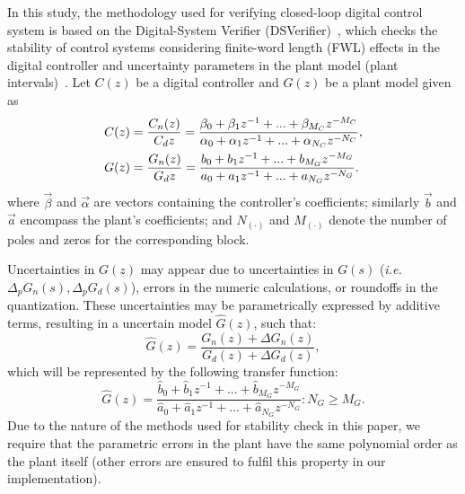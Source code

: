 \documentclass{sig-alternate-05-2015}
\begin{document}
In this study, the methodology used for verifying closed-loop digital
control system is based on the Digital-System Verifier
(DSVerifier)~\cite{IsmailBCFF15}, which checks the stability of control
systems considering finite-word length (FWL) effects in the digital
controller and uncertainty parameters in the plant model (plant
intervals)~\cite{Bessa16}.  Let $C(z)$ be a digital controller and $G(z)$ be
a plant model given as
%
\begin{align}
\small
\label{controller_plant_tf}
C(z)&=\frac{C_n(z)}{C_d{z}}=\frac{\beta_{0}+\beta_{1}z^{-1}+...+\beta_{M_C}z^{-M_C}}{\alpha_{0}+\alpha_{1}z^{-1}+...+\alpha_{N_C}z^{-N_C}}, \\
G(z)&=\frac{G_n(z)}{G_d{z}}=\frac{b_{0}+b_{1}z^{-1}+...+b_{M_G}z^{-M_G}}{a_{0}+a_{1}z^{-1}+...+a_{N_G}z^{-N_G}}.
\end{align}
%
\noindent where $\vec{\beta}$ and $\vec{\alpha}$ are vectors containing the
controller's coefficients; similarly $\vec{b}$ and $\vec{a}$ encompass the
plant's coefficients; and $N_{(\cdot)}$ and $M_{(\cdot)}$ denote the number
of poles and zeros for the corresponding block.

Uncertainties in $G(z)$ may appear due to uncertainties in $G(s)$
(\emph{i.e.} $\Delta_p{G}_n(s),\Delta_p{G}_d(s)$), errors in the numeric
calculations, or roundoffs in the quantization.  These uncertainties may be
parametrically expressed by additive terms, resulting in a uncertain model
$\hat{G}(z)$, such that:
%
\begin{equation}
\hat{G}(z)=\frac{G_n(z)+\Delta G_n(z)}{G_d(z)+\Delta G_d(z)},
\end{equation}
%
which will be represented by the following transfer function:
%
\begin{equation}
\hat{G}(z)=\frac{\hat{b}_{0}+\hat{b}_{1}z^{-1}+...+\hat{b}_{M_G}z^{-M_G}}{\hat{a}_{0}+\hat{a}_{1}z^{-1}+...+\hat{a}_{N_G}z^{-N_G}} : N_G \geq M_G .
\end{equation}
%
Due to the nature of the methods used for stability check in this paper, we
require that the parametric errors in the plant have the same polynomial
order as the plant itself (other errors are ensured to fulfil this property
in our implementation).
\end{document}
